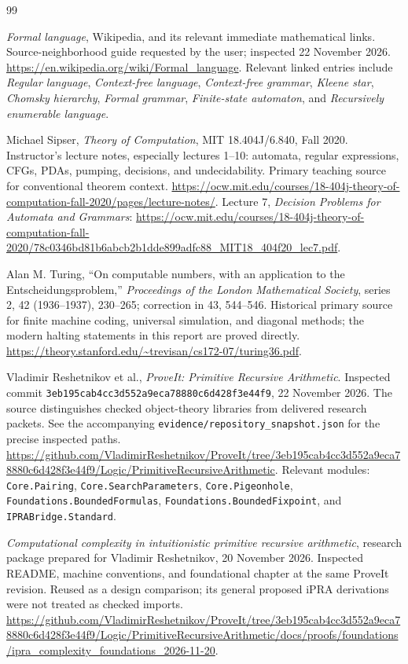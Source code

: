 \begin{thebibliography}{99}
\raggedright

\emph{Formal language}, Wikipedia, and its relevant immediate mathematical
links. Source-neighborhood guide requested by the user; inspected
22 November 2026.
\url{https://en.wikipedia.org/wiki/Formal_language}.
Relevant linked entries include \emph{Regular language},
\emph{Context-free language}, \emph{Context-free grammar},
\emph{Kleene star}, \emph{Chomsky hierarchy}, \emph{Formal grammar},
\emph{Finite-state automaton}, and \emph{Recursively enumerable language}.

Michael Sipser, \emph{Theory of Computation}, MIT 18.404J/6.840,
Fall 2020. Instructor's lecture notes, especially lectures 1--10:
automata, regular expressions, CFGs, PDAs, pumping, decisions, and
undecidability. Primary teaching source for conventional theorem context.
\url{https://ocw.mit.edu/courses/18-404j-theory-of-computation-fall-2020/pages/lecture-notes/}.
Lecture 7, \emph{Decision Problems for Automata and Grammars}:
\url{https://ocw.mit.edu/courses/18-404j-theory-of-computation-fall-2020/78c0346bd81b6abcb2b1dde899adfc88_MIT18_404f20_lec7.pdf}.

Alan M. Turing, ``On computable numbers, with an application to the
Entscheidungsproblem,'' \emph{Proceedings of the London Mathematical
Society}, series 2, 42 (1936--1937), 230--265; correction in 43,
544--546. Historical primary source for finite machine coding,
universal simulation, and diagonal methods; the modern halting
statements in this report are proved directly.
\url{https://theory.stanford.edu/~trevisan/cs172-07/turing36.pdf}.

Vladimir Reshetnikov et al., \emph{ProveIt: Primitive Recursive Arithmetic}.
Inspected commit \texttt{3eb195cab4cc3d552a9eca78880c6d428f3e44f9},
22 November 2026. The source distinguishes checked object-theory libraries
from delivered research packets. See the accompanying
\texttt{evidence/repository\_snapshot.json} for the precise inspected paths.
\url{https://github.com/VladimirReshetnikov/ProveIt/tree/3eb195cab4cc3d552a9eca78880c6d428f3e44f9/Logic/PrimitiveRecursiveArithmetic}.
Relevant modules: \texttt{Core.Pairing}, \texttt{Core.SearchParameters},
\texttt{Core.Pigeonhole}, \texttt{Foundations.BoundedFormulas},
\texttt{Foundations.BoundedFixpoint}, and \texttt{IPRABridge.Standard}.

\emph{Computational complexity in intuitionistic primitive recursive
arithmetic}, research package prepared for Vladimir Reshetnikov,
20 November 2026. Inspected README, machine conventions, and foundational
chapter at the same ProveIt revision. Reused as a design comparison;
its general proposed iPRA derivations were not treated as checked imports.
\url{https://github.com/VladimirReshetnikov/ProveIt/tree/3eb195cab4cc3d552a9eca78880c6d428f3e44f9/Logic/PrimitiveRecursiveArithmetic/docs/proofs/foundations/ipra_complexity_foundations_2026-11-20}.


\end{thebibliography}
